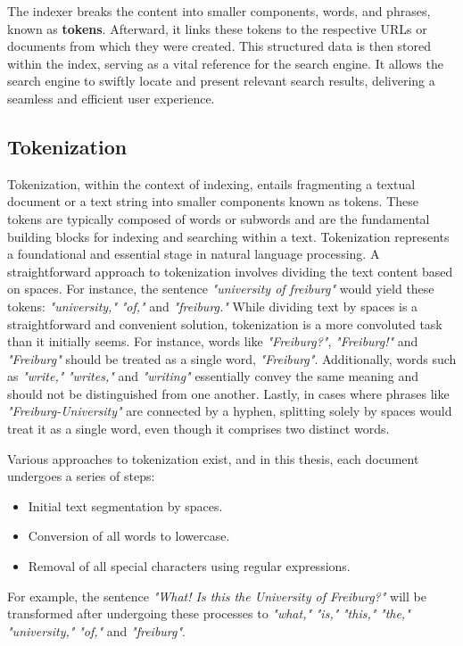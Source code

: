 The indexer breaks the content into smaller components, words, and phrases, known as \textbf{tokens}. Afterward, it links these tokens to the respective URLs or documents from which they were created. This structured data is then stored within the index, serving as a vital reference for the search engine. It allows the search engine to swiftly locate and present relevant search results, delivering a seamless and efficient user experience.

\subsection{Tokenization}
Tokenization, within the context of indexing, entails fragmenting a textual document or a text string into smaller components known as tokens. These tokens are typically composed of words or subwords and are the fundamental building blocks for indexing and searching within a text. Tokenization represents a foundational and essential stage in natural language processing. A straightforward approach to tokenization involves dividing the text content based on spaces. For instance, the sentence \textit{"university of freiburg"} would yield these tokens: \textit{"university,"} \textit{"of,"} and \textit{"freiburg."}
While dividing text by spaces is a straightforward and convenient solution, tokenization is a more convoluted task than it initially seems. For instance, words like \textit{"Freiburg?"}, \textit{"Freiburg!"} and \textit{"Freiburg"} should be treated as a single word, \textit{"Freiburg"}. Additionally, words such as \textit{"write,"} \textit{"writes,"} and \textit{"writing"} essentially convey the same meaning and should not be distinguished from one another. Lastly, in cases where phrases like \textit{"Freiburg-University"} are connected by a hyphen, splitting solely by spaces would treat it as a single word, even though it comprises two distinct words.

Various approaches to tokenization exist, and in this thesis, each document undergoes a series of steps:

\begin{itemize}
	\item Initial text segmentation by spaces.
	\item Conversion of all words to lowercase.
	\item Removal of all special characters using regular expressions.
\end{itemize}


For example, the sentence \textit{"What! Is this the University of Freiburg?"} will be transformed after undergoing these processes to \textit{"what,"} \textit{"is,"} \textit{"this,"} \textit{"the,"} \textit{"university,"} \textit{"of,"} and \textit{"freiburg"}. 

